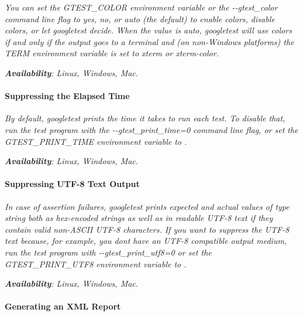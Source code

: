{\itshape You can set the {\ttfamily G\+T\+E\+S\+T\+\_\+\+C\+O\+L\+OR} environment variable or the {\ttfamily -\/-\/gtest\+\_\+color} command line flag to {\ttfamily yes}, {\ttfamily no}, or {\ttfamily auto} (the default) to enable colors, disable colors, or let googletest decide. When the value is {\ttfamily auto}, googletest will use colors if and only if the output goes to a terminal and (on non-\/\+Windows platforms) the {\ttfamily T\+E\+RM} environment variable is set to {\ttfamily xterm} or {\ttfamily xterm-\/color}.}

{\itshape  {\bfseries Availability}\+: Linux, Windows, Mac.}

{\itshape \paragraph*{Suppressing the Elapsed Time}}

{\itshape }

{\itshape By default, googletest prints the time it takes to run each test. To disable that, run the test program with the {\ttfamily -\/-\/gtest\+\_\+print\+\_\+time=0} command line flag, or set the G\+T\+E\+S\+T\+\_\+\+P\+R\+I\+N\+T\+\_\+\+T\+I\+ME environment variable to {}.}

{\itshape {\bfseries Availability}\+: Linux, Windows, Mac.}

{\itshape \paragraph*{Suppressing U\+T\+F-\/8 Text Output}}

{\itshape }

{\itshape In case of assertion failures, googletest prints expected and actual values of type {\ttfamily string} both as hex-\/encoded strings as well as in readable U\+T\+F-\/8 text if they contain valid non-\/\+A\+S\+C\+II U\+T\+F-\/8 characters. If you want to suppress the U\+T\+F-\/8 text because, for example, you don\textquotesingle{}t have an U\+T\+F-\/8 compatible output medium, run the test program with {\ttfamily -\/-\/gtest\+\_\+print\+\_\+utf8=0} or set the {\ttfamily G\+T\+E\+S\+T\+\_\+\+P\+R\+I\+N\+T\+\_\+\+U\+T\+F8} environment variable to {}.}

{\itshape {\bfseries Availability}\+: Linux, Windows, Mac.}

{\itshape \paragraph*{Generating an X\+ML Report}}

